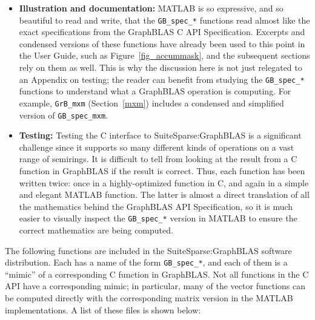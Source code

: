 \documentclass[12pt]{article}
\begin{document}
\begin{itemize}

\item {\bf Illustration and documentation:}  MATLAB is so expressive, and so
    beautiful to read and write, that the \verb'GB_spec_*' functions read
    almost like the exact specifications from the GraphBLAS C API
    Specification.  Excerpts and condensed versions of these functions have
    already been used to this point in the User Guide, such as
    Figure~\ref{fig_accummask}, and the subsequent sections rely on them as
    well.  This is why the discussion here is not just relegated to an Appendix
    on testing; the reader can benefit from studying the \verb'GB_spec_*'
    functions to understand what a GraphBLAS operation is computing.  For
    example, \verb'GrB_mxm' (Section~\ref{mxm}) includes a condensed and
    simplified version of \verb'GB_spec_mxm'.

\item {\bf Testing:} Testing the C interface to SuiteSparse:GraphBLAS is a
    significant challenge since it supports so many different kinds of
    operations on a vast range of semirings.  It is difficult to tell from
    looking at the result from a C function in GraphBLAS if the result is
    correct.  Thus, each function has been written twice: once in a
    highly-optimized function in C, and again in a simple and elegant MATLAB
    function.  The latter is almost a direct translation of all the mathematics
    behind the GraphBLAS API Specification, so it is much easier to visually
    inspect the \verb'GB_spec_*' version in MATLAB to ensure the correct
    mathematics are being computed.

\end{itemize}

The following functions are included in the SuiteSparse:GraphBLAS software
distribution.  Each has a name of the form \verb'GB_spec_*', and each of them
is a ``mimic'' of a corresponding C function in GraphBLAS.  Not all functions
in the C API have a corresponding mimic; in particular, many of the vector
functions can be computed directly with the corresponding matrix version in the
MATLAB implementations.  A list of these files is shown below:
\end{document}
